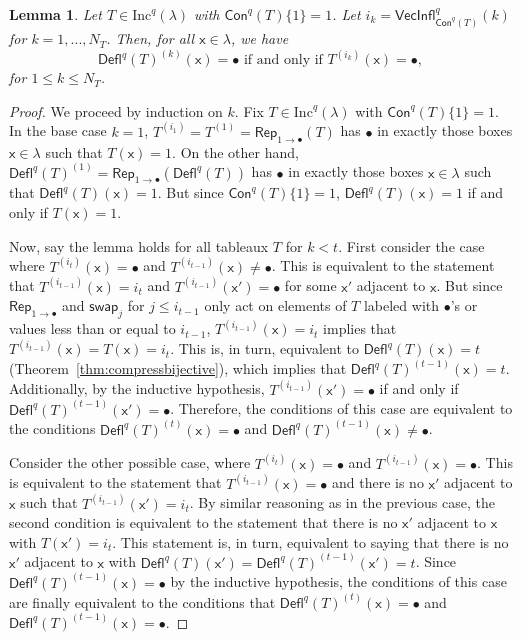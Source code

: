 \documentclass[12pt]{amsart}
\newcommand{\x}{\ensuremath{\mathsf{x}}}
\newtheorem{lemma}[theorem]{Lemma}
\theoremstyle{definition}
\theoremstyle{remark}
\numberwithin{equation}{section}
\newcommand{\inc}{\ensuremath{\mathrm{Inc}}}
\newcommand{\swap}{\ensuremath{\mathsf{swap}}}
\newcommand{\rep}{\ensuremath{\mathsf{Rep}}}
\newcommand{\deflate}{\ensuremath{\mathsf{Defl}}}
\newcommand{\inflate}{\ensuremath{\mathsf{VecInfl}}}
\newcommand{\content}{\ensuremath{\mathsf{Con}}}
\begin{document}
\begin{lemma} \label{lem:bullet_placement}
Let $T \in \inc^q(\lambda)$ with $\content^q(T) \lbrace 1 \rbrace = 1$. Let $i_k = \inflate^q_{\content^q(T)}(k)$ for $k = 1,...,N_T$. Then, for all $\x \in \lambda$, we have
 \begin{equation}\label{eq:gappy_promotion2}
\deflate^q(T)^{(k)}(\x) = \bullet \text{ if and only if } T^{(i_k)}(\x) = \bullet,
\end{equation}
for $1 \leq k \leq N_T$.
\end{lemma}
\begin{proof} We proceed by induction on $k$. Fix $T \in \inc^q(\lambda)$  with $\content^q(T) \lbrace 1 \rbrace = 1$. In the base case $k = 1$,  $T^{(i_1)} = T^{(1)} = \rep_{1 \rightarrow \bullet}(T)$ has $\bullet$ in exactly those boxes $\x \in \lambda$ such that $T(\x) = 1$. On the other hand, $\deflate^q(T)^{(1)} =  \rep_{1 \rightarrow \bullet}(\deflate^q(T))$ has $\bullet$ in exactly those boxes $\x \in \lambda$ such that $\deflate^q(T)(\x) = 1$. But since $\content^q(T) \lbrace 1 \rbrace = 1$, $\deflate^q(T)(\x) = 1$ if and only if $T(\x) = 1$. 


Now, say the lemma holds for all tableaux $T$ for $k < t$. First consider the case where $T^{(i_t)}(\x) = \bullet$ and $T^{(i_{t-1})}(\x) \neq \bullet$. This is equivalent to the statement that $T^{(i_{t-1})}(\x) = i_t$ and $T^{(i_{t-1})}(\x') = \bullet$ for some $\x'$ adjacent to $\x$. But since $\rep_{1 \rightarrow \bullet}$ and $\swap_j$ for  $j \leq i_{t-1}$ only act on elements of $T$ labeled with $\bullet$'s or values less than or equal to $i_{t-1}$, $T^{(i_{t-1})}(\x) = i_t$ implies that $T^{(i_{t-1})}(\x) = T(\x) = i_t$. This is, in turn, equivalent to $\deflate^q(T)(\x) = t$ (Theorem~\ref{thm:compressbijective}), which implies that $\deflate^q(T)^{(t-1)}(\x) = t$. Additionally, by the inductive hypothesis, $T^{(i_{t-1})}(\x') = \bullet$ if and only if $\deflate^q(T)^{(t-1)}(\x') = \bullet$. Therefore, the conditions of this case are equivalent to the conditions $\deflate^q(T)^{(t)}(\x) = \bullet$ and $\deflate^q(T)^{(t-1)}(\x) \neq \bullet$. 

Consider the other possible case, where $T^{(i_t)}(\x) = \bullet$ and $T^{(i_{t-1})}(\x) = \bullet$. This is equivalent to the statement that $T^{(i_{t-1})}(\x) = \bullet$ and there is no $\x'$ adjacent to $\x$ such that $T^{(i_{t-1})}(\x') = i_t$. By similar reasoning as in the previous case, the second condition is equivalent to the statement that there is no $\x'$ adjacent to $\x$ with $T(\x') = i_t$. This statement is, in turn, equivalent to saying that there is no $\x'$ adjacent to $\x$ with $\deflate^q(T)(\x') = \deflate^q(T)^{(t-1)}(\x') = t$. Since $\deflate^q(T)^{(t-1)}(\x) = \bullet$ by the inductive hypothesis, the conditions of this case are finally equivalent to the conditions that $\deflate^q(T)^{(t)}(\x) = \bullet$ and $\deflate^q(T)^{(t-1)}(\x) = \bullet$.
\end{proof}
\end{document}
